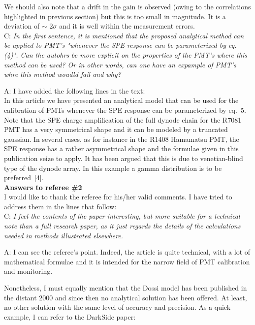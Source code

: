 \documentclass[a4paper,11pt]{article}
\begin{document}
We should also note that a drift in the gain is observed (owing to the correlations highlighted in previous section) but this is too small in magnitude.
It is a deviation of $\sim$ 2$\sigma$ and it is well within the measurement errors.    
\\[1ex]

C: \emph{ In the first sentence, it is mentioned that the proposed analytical method can be applied to PMT's "whenever the SPE response can be parameterized by eq. (4)". 
Can the autohrs be more explicit on the properties of the PMT's where this method can be used? 
Or in other words, can one have an expample of PMT's whre this method woudld fail and why? }

A: I have added the following lines in the text:
\\[1ex]

In this article we have presented an analytical model that can be used for the calibration of PMTs whenever the SPE response can be parameterized by eq.~5.  
Note that the SPE charge amplification of the full dynode chain for the R7081 PMT has a very symmetrical shape and it can be modeled by a truncated gaussian.  
In several cases, as for instance in the R1408 Hamamatsu PMT, the SPE response has a rather asymmetrical shape and the formulae given in this publication seize  to apply. %
It has been argued that this is due to venetian-blind type of the dynode array. %
In this example a gamma distribution is to be preferred~[4]. 
\\[1ex]


\vspace{1cm}
{\bf Answers to referee \#2}
\\[1ex]

I would like to thank the referee for his/her valid comments. 
I have tried to address them in the lines that follow: 
\\[1ex]

C: \emph{I feel the contents of the paper interesting, but more suitable for a technical note than a full research paper, as it just regards the details of the calculations needed in methods illustrated elsewhere.}

A: I can see the referee's point. Indeed, the article is quite technical, with a lot of mathematical formulae and it is intended for the narrow field of PMT calibration and monitoring. 

Nonetheless, I must equally mention that the Dossi model has been published in the distant 2000 and since then no analytical solution has been offered. 
At least, no other solution with the same level of accuracy and precision. 
As a quick example, I can refer to the DarkSide paper:
\\[1ex]
\end{document}
